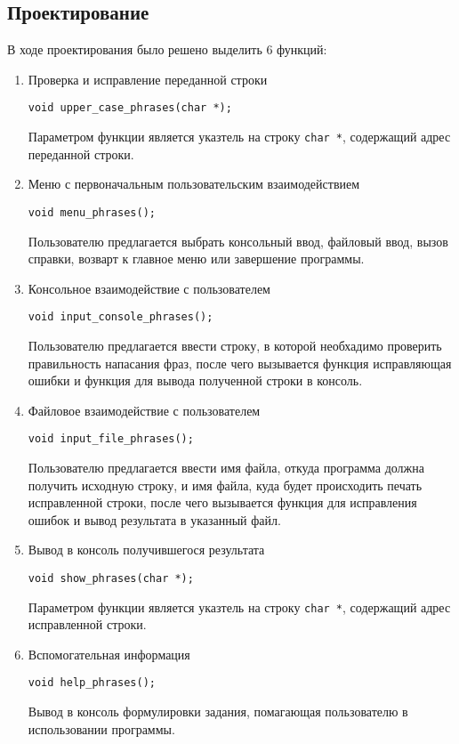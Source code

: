 \documentclass[12pt,a4paper]{report}
\begin{document}
\subsection{Проектирование}
\hspace{\parindent}В ходе проектирования было решено выделить 6 функций:
\begin{enumerate}
 	\item Проверка и исправление переданной строки
 	
 	\verb+void upper_case_phrases(char *);+
 	
	Параметром функции является указтель на строку \verb+char *+, содержащий адрес переданной строки.	 
		 
		 
	\item Меню с первоначальным пользовательским взаимодействием
	
	\verb+void menu_phrases();+ 
	
	Пользователю предлагается выбрать консольный ввод, файловый ввод, вызов справки, возварт к главное меню или завершение программы. 	 
		 
	\item Консольное взаимодействие с пользователем
	
	\verb+void input_console_phrases();+

	Пользователю предлагается ввести строку, в которой необхадимо проверить правильность напасания фраз, после чего вызывается функция исправляющая ошибки и функция для вывода полученной строки в консоль.
	
	\item Файловое взаимодействие с пользователем
	
	\verb+void input_file_phrases();+

	Пользователю предлагается ввести имя файла, откуда программа должна получить исходную строку, и имя файла, куда будет происходить печать исправленной строки, после чего вызывается функция для исправления ошибок и вывод результата в указанный файл.
	
	\item Вывод в консоль получившегося результата
	
	\verb+void show_phrases(char *);+

Параметром функции является указтель на строку \verb+char *+, содержащий адрес исправленной строки.
	
	
	\item Вспомогательная информация
	
	\verb+void help_phrases();+
	
	Вывод в консоль формулировки задания, помагающая пользователю в использовании программы.
\end{enumerate}
\end{document}
